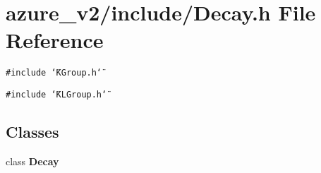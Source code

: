 \section{azure\_\-v2/include/Decay.h File Reference}
\label{Decay_8h}
{\tt \#include \char`\"{}KGroup.h\char`\"{}}\par
{\tt \#include \char`\"{}KLGroup.h\char`\"{}}\par
\subsection*{Classes}
\begin{CompactItemize}
\item 
class \bf{Decay}
\end{CompactItemize}
